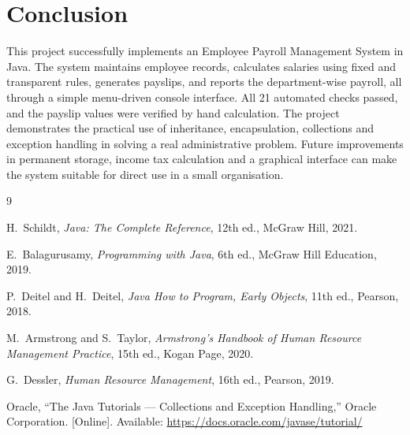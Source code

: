 \documentclass[11pt,a4paper]{article}
\begin{document}
\section{Conclusion}

This project successfully implements an Employee Payroll Management
System in Java. The system maintains employee records, calculates
salaries using fixed and transparent rules, generates payslips, and
reports the department-wise payroll, all through a simple
menu-driven console interface. All 21 automated checks passed, and
the payslip values were verified by hand calculation. The project
demonstrates the practical use of inheritance, encapsulation,
collections and exception handling in solving a real administrative
problem. Future improvements in permanent storage, income tax
calculation and a graphical interface can make the system suitable
for direct use in a small organisation.

\begin{thebibliography}{9}

 H.~Schildt, \textit{Java: The Complete Reference},
  12th ed., McGraw Hill, 2021.

 E.~Balagurusamy, \textit{Programming with Java},
  6th ed., McGraw Hill Education, 2019.

 P.~Deitel and H.~Deitel, \textit{Java How to Program,
  Early Objects}, 11th ed., Pearson, 2018.

 M.~Armstrong and S.~Taylor, \textit{Armstrong's
  Handbook of Human Resource Management Practice}, 15th ed.,
  Kogan Page, 2020.

 G.~Dessler, \textit{Human Resource Management},
  16th ed., Pearson, 2019.

 Oracle, ``The Java Tutorials --- Collections and
  Exception Handling,'' Oracle Corporation. [Online]. Available:
  \url{https://docs.oracle.com/javase/tutorial/}

\end{thebibliography}
\end{document}
